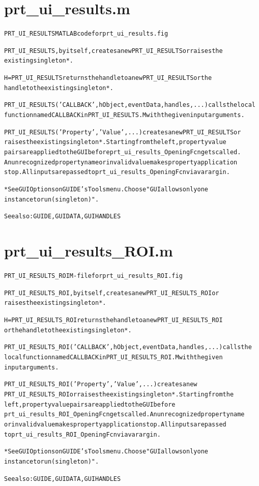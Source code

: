 \section{prt\_ui\_results.m}
\begin{alltt}

 PRT\_UI\_RESULTS MATLAB code for prt\_ui\_results.fig
 
 PRT\_UI\_RESULTS, by itself, creates a new PRT\_UI\_RESULTS or raises the
 existing singleton*.
 
 H = PRT\_UI\_RESULTS returns the handle to a new PRT\_UI\_RESULTS or the
 handle to the existing singleton*.
 
 PRT\_UI\_RESULTS('CALLBACK',hObject,eventData,handles,...) calls the local
 function named CALLBACK in PRT\_UI\_RESULTS.M with the given input arguments.
 
 PRT\_UI\_RESULTS('Property','Value',...) creates a new PRT\_UI\_RESULTS or
 raises the existing singleton*.  Starting from the left, property value
 pairs are applied to the GUI before prt\_ui\_results\_OpeningFcn gets called.
 An unrecognized property name or invalid value makes property application
 stop.  All inputs are passed to prt\_ui\_results\_OpeningFcn via varargin.
 
 *See GUI Options on GUIDE's Tools menu.  Choose "GUI allows only one
 instance to run (singleton)".
 
 See also: GUIDE, GUIDATA, GUIHANDLES
\end{alltt}


\section{prt\_ui\_results\_ROI.m}
\begin{alltt}

 PRT\_UI\_RESULTS\_ROI M-file for prt\_ui\_results\_ROI.fig
 
 PRT\_UI\_RESULTS\_ROI, by itself, creates a new PRT\_UI\_RESULTS\_ROI or 
 raises the existing singleton*.
 
 H = PRT\_UI\_RESULTS\_ROI returns the handle to a new PRT\_UI\_RESULTS\_ROI 
 or the handle to the existing singleton*.
 
 PRT\_UI\_RESULTS\_ROI('CALLBACK',hObject,eventData,handles,...) calls the 
 local function named CALLBACK in PRT\_UI\_RESULTS\_ROI.M with the given 
 input arguments.
 
 PRT\_UI\_RESULTS\_ROI('Property','Value',...) creates a new 
 PRT\_UI\_RESULTS\_ROI or raises the existing singleton*.  Starting from the
 left, property value pairs are applied to the GUI before 
 prt\_ui\_results\_ROI\_OpeningFcn gets called.  An unrecognized property name
 or invalid value makes property application stop.  All inputs are passed 
 to prt\_ui\_results\_ROI\_OpeningFcn via varargin.
 
 *See GUI Options on GUIDE's Tools menu.  Choose "GUI allows only one
  instance to run (singleton)".
 
 See also: GUIDE, GUIDATA, GUIHANDLES
\end{alltt}


